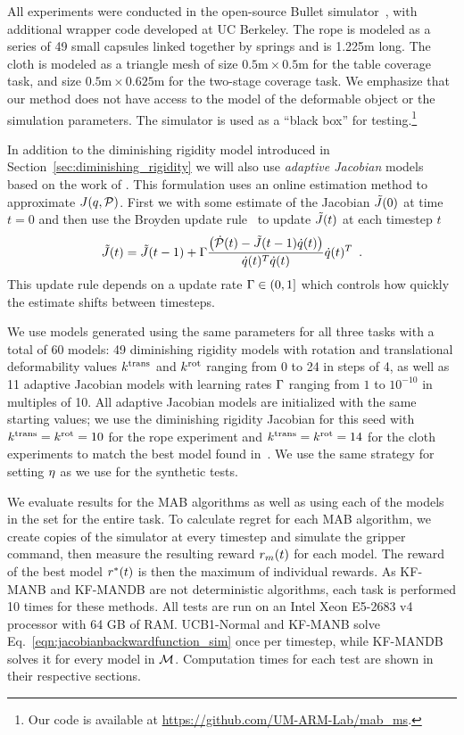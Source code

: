 All experiments were conducted in the open-source Bullet simulator~\cite{Coumans2010}, with additional wrapper code developed at UC Berkeley. The rope is modeled as a series of 49 small capsules linked together by springs and is 1.225m long. The cloth is modeled as a triangle mesh of size $0.5\text{m} \times 0.5\text{m}$ for the table coverage task, and size $0.5\text{m} \times 0.625\text{m}$ for the two-stage coverage task. We emphasize that our method does not have access to the model of the deformable object or the simulation parameters. The simulator is used as a ``black box'' for testing.\footnote{Our code is available at \url{https://github.com/UM-ARM-Lab/mab_ms}.}

In addition to the diminishing rigidity model introduced in Section~\ref{sec:diminishing_rigidity} we will also use \textit{adaptive Jacobian} models based on the work of \citet{Navarro-Alarcon2014}. This formulation uses an online estimation method to approximate $J(q, \mathcal{P})$.
First we with some estimate of the Jacobian $\tilde {J}(0)$ at time $t = 0$ and then use the Broyden update rule~\cite{Broyden1965} to update $\tilde {J}(t)$ at each timestep $t$
\begin{equation}
    \tilde {J}(t) = \tilde J(t-1) + \Gamma \frac{\left( \dot{\mathcal{P}}(t) - \tilde {J}(t-1) \dot{q}(t) \right)}{\dot{q}(t)^T \dot{q}(t)} \dot{q}(t)^T \enspace.
\end{equation}
This update rule depends on a update rate $\Gamma \in (0, 1]$ which controls how quickly the estimate shifts between timesteps.

We use models generated using the same parameters for all three tasks with a total of 60 models: 49 diminishing rigidity models with rotation and translational deformability values $k^{\textrm{trans}}$ and $k^{\textrm{rot}}$ ranging from 0 to 24 in steps of 4, as well as 11 adaptive Jacobian models with learning rates $\Gamma$ ranging from $1$ to $10^{-10}$ in multiples of 10. All adaptive Jacobian models are initialized with the same starting values; we use the diminishing rigidity Jacobian for this seed with $k^{\textrm{trans}}=k^{\textrm{rot}}=10$ for the rope experiment and $k^{\textrm{trans}}=k^{\textrm{rot}}=14$ for the cloth experiments to match the best model found in~\cite{Berenson2013}. We use the same strategy for setting $\eta$ as we use for the synthetic tests. 

We evaluate results for the MAB algorithms as well as using each of the models in the set for the entire task. To calculate regret for each MAB algorithm, we create copies of the simulator at every timestep and simulate the gripper command, then measure the resulting reward $r_m(t)$ for each model. The reward of the best model $r^*(t)$ is then the maximum of individual rewards. As KF-MANB and KF-MANDB are not deterministic algorithms, each task is performed 10 times for these methods. All tests are run on an Intel Xeon E5-2683 v4 processor with 64 GB of RAM. UCB1-Normal and KF-MANB solve Eq.~\eqref{eqn:jacobianbackwardfunction_sim} once per timestep, while KF-MANDB solves it for every model in $\mathcal{M}$. Computation times for each test are shown in their respective sections.



